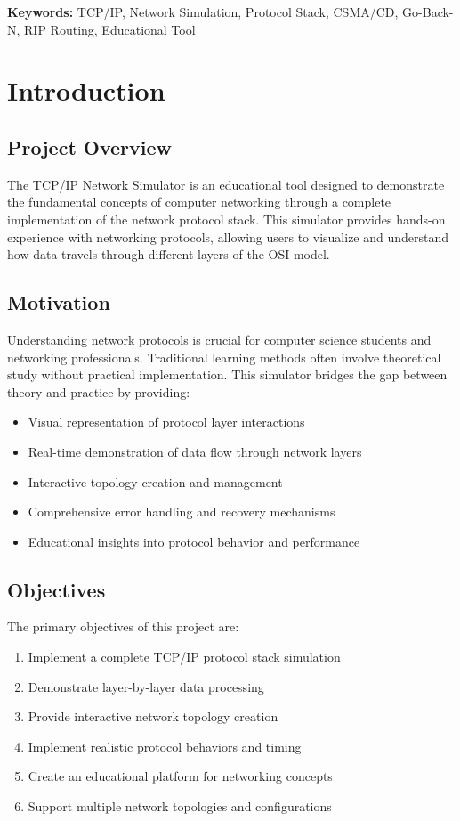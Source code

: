 \documentclass[12pt,a4paper]{article}
\begin{document}
\textbf{Keywords:} TCP/IP, Network Simulation, Protocol Stack, CSMA/CD, Go-Back-N, RIP Routing, Educational Tool

\newpage

\section{Introduction}

\subsection{Project Overview}

The TCP/IP Network Simulator is an educational tool designed to demonstrate the fundamental concepts of computer networking through a complete implementation of the network protocol stack. This simulator provides hands-on experience with networking protocols, allowing users to visualize and understand how data travels through different layers of the OSI model.

\subsection{Motivation}

Understanding network protocols is crucial for computer science students and networking professionals. Traditional learning methods often involve theoretical study without practical implementation. This simulator bridges the gap between theory and practice by providing:

\begin{itemize}
\item Visual representation of protocol layer interactions
\item Real-time demonstration of data flow through network layers
\item Interactive topology creation and management
\item Comprehensive error handling and recovery mechanisms
\item Educational insights into protocol behavior and performance
\end{itemize}

\subsection{Objectives}

The primary objectives of this project are:

\begin{enumerate}
\item Implement a complete TCP/IP protocol stack simulation
\item Demonstrate layer-by-layer data processing
\item Provide interactive network topology creation
\item Implement realistic protocol behaviors and timing
\item Create an educational platform for networking concepts
\item Support multiple network topologies and configurations
\end{enumerate}
\end{document}
